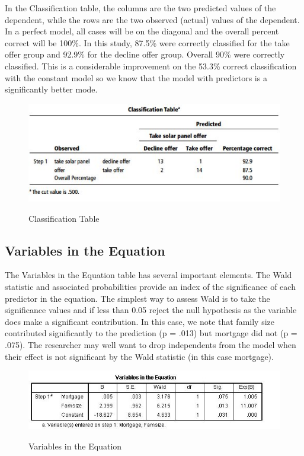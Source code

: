 \documentclass[a4paper,12pt]{article}
\begin{document}
In the Classification table, the columns are the two predicted values of the dependent, while the rows are the two observed (actual) values of the dependent. In a perfect model, all cases will be on the diagonal and the
overall percent correct will be 100\%. In this study, 87.5\% were correctly classified for the take offer group and 92.9\% for the decline offer group. Overall 90\% were correctly classified. This is a considerable improvement on the 53.3\% correct classification with the constant model so we know that the model with predictors is a significantly better mode.
\begin{figure}[h!]
\begin{center}
  \includegraphics[scale=0.6]{images/Logistic7}\\
  \caption{Classification Table}
\end{center}
\end{figure}

\subsection{Variables in the Equation}
The Variables in the Equation table has several important elements. The Wald statistic and associated probabilities provide an index of the significance of each predictor in the equation.
The simplest way to assess Wald is to take the significance values and if less
than 0.05 reject the null hypothesis as the variable does make a significant contribution.
In this case, we note that family size contributed significantly to the prediction
(p = .013) but mortgage did not (p = .075). The researcher may well want to drop
independents from the model when their effect is not significant by the Wald statistic
(in this case mortgage).

\begin{figure}
\begin{center}
  \includegraphics[scale=0.6]{images/Logistic8}\\
  \caption{Variables in the Equation}
\end{center}
\end{figure}
\end{document}
